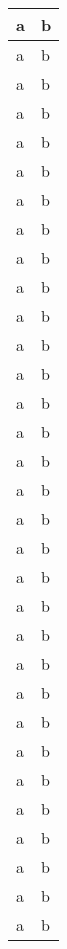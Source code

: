 \documentclass[letterpaper,10pt,english]{sphinxmanual}
\begin{document}
\begin{longtable}{|l|l|}
a
 & 
b
\\
\hline
a
 & 
b
\\
\hline
a
 & 
b
\\
\hline
a
 & 
b
\\
\hline
a
 & 
b
\\
\hline
a
 & 
b
\\
\hline
a
 & 
b
\\
\hline
a
 & 
b
\\
\hline
a
 & 
b
\\
\hline
a
 & 
b
\\
\hline
a
 & 
b
\\
\hline
a
 & 
b
\\
\hline
a
 & 
b
\\
\hline
a
 & 
b
\\
\hline
a
 & 
b
\\
\hline
a
 & 
b
\\
\hline
a
 & 
b
\\
\hline
a
 & 
b
\\
\hline
a
 & 
b
\\
\hline
a
 & 
b
\\
\hline
a
 & 
b
\\
\hline
a
 & 
b
\\
\hline
a
 & 
b
\\
\hline
a
 & 
b
\\
\hline
a
 & 
b
\\
\hline
a
 & 
b
\\
\hline
a
 & 
b
\\
\hline
a
 & 
b
\\
\hline
a
 & 
b
\\
\hline
a
 & 
b
\\
\hline
a
 & 
b
\\
\hline
a
 & 
b
\\
\hline\end{longtable}

\begin{thebibliography}{AuthorYear}
\end{thebibliography}



\renewcommand{\indexname}{Index}
\printindex
\end{document}
